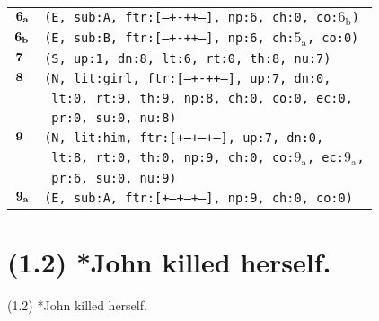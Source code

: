 \documentclass{article}
\begin{document}
\begin{minipage}{\textwidth}
{\begin{tabular}{|r|l|}
    ${\textbf{\textrm{6}}_{\textbf{\textrm{a}}}}$ & \texttt{\texttt{(E,~sub:A,~ftr:[---+-++--],~np:6,~ch:0,~co:${\textrm{6}_{\textrm{b}}}$)}} \\
    ${\textbf{\textrm{6}}_{\textbf{\textrm{b}}}}$ & \texttt{\texttt{(E,~sub:B,~ftr:[---+-++--],~np:6,~ch:${\textrm{5}_{\textrm{a}}}$,~co:0)}} \\
    ${\textbf{\textrm{7}}_{\phantom{z}}}$ & \texttt{\texttt{(S,~up:1,~dn:8,~lt:6,~rt:0,~th:8,~nu:7)}} \\
    ${\textbf{\textrm{8}}_{\phantom{z}}}$ & \texttt{\texttt{(N,~lit:girl,~ftr:[---+-++--],~up:7,~dn:0,}} \\
    & \texttt{\texttt{~lt:0,~rt:9,~th:9,~np:8,~ch:0,~co:0,~ec:0,}} \\
    & \texttt{\texttt{~pr:0,~su:0,~nu:8)}} \\
    ${\textbf{\textrm{9}}_{\phantom{z}}}$ & \texttt{\texttt{(N,~lit:him,~ftr:[+--+--+--],~up:7,~dn:0,}} \\
    & \texttt{\texttt{~lt:8,~rt:0,~th:0,~np:9,~ch:0,~co:${\textrm{9}_{\textrm{a}}}$,~ec:${\textrm{9}_{\textrm{a}}}$,}} \\
    & \texttt{\texttt{~pr:6,~su:0,~nu:9)}} \\
    ${\textbf{\textrm{9}}_{\textbf{\textrm{a}}}}$ & \texttt{\texttt{(E,~sub:A,~ftr:[+--+--+--],~np:9,~ch:0,~co:0)}} \\
    \hline
  \end{tabular}
  }
\end{minipage}
\bigbreak

\clearpage

%
%

\section*{(1.2) *John killed herself.}

\bigbreak
\begin{enumerate*}
\item[(1.2)] *John killed herself.
\end{enumerate*}
\bigbreak
\end{document}
